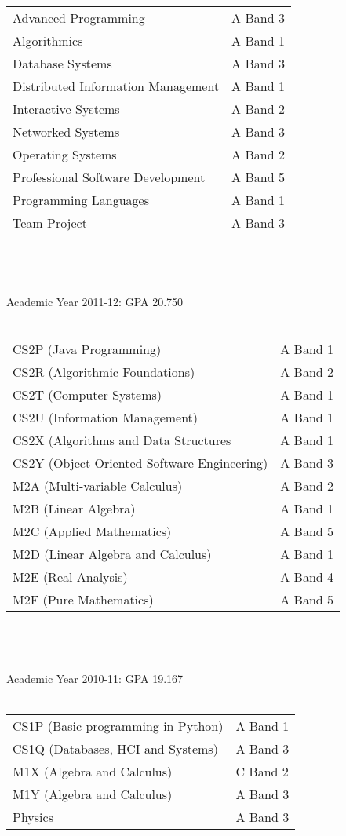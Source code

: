 \documentclass[10pt,a4paper]{article}
\begin{document}
\begin{tabular}{p{10cm}l}
    Advanced Programming & A Band 3\\
    Algorithmics & A Band 1\\
    Database Systems & A Band 3\\
    Distributed Information Management & A Band 1\\
    Interactive Systems & A Band 2\\
    Networked Systems & A Band 3\\
    Operating Systems & A Band 2\\
    Professional Software Development & A Band 5\\
    Programming Languages & A Band 1\\
    Team Project & A Band 3\\
\end{tabular}
\\\\\\
Academic Year 2011-12: GPA 20.750\\\\
\begin{tabular}{p{10cm}l}
    CS2P (Java Programming) & A Band 1\\
    CS2R (Algorithmic Foundations) & A Band 2\\
    CS2T (Computer Systems) & A Band 1\\
    CS2U (Information Management) & A Band 1\\
    CS2X (Algorithms and Data Structures & A Band 1\\
    CS2Y (Object Oriented Software Engineering) & A Band 3\\
    M2A (Multi-variable Calculus) & A Band 2\\
    M2B (Linear Algebra) & A Band 1\\
    M2C (Applied Mathematics) & A Band 5\\
    M2D (Linear Algebra and Calculus) & A Band 1\\
    M2E (Real Analysis) & A Band 4\\
    M2F (Pure Mathematics) & A Band 5\\
\end{tabular}
\\\\\\
Academic Year 2010-11: GPA 19.167\\\\
\begin{tabular}{p{10cm}l}
    CS1P (Basic programming in Python) & A Band 1\\
    CS1Q (Databases, HCI and Systems) & A Band 3\\
    M1X (Algebra and Calculus) & C Band 2\\
    M1Y (Algebra and Calculus) & A Band 3\\
    Physics & A Band 3\\
\end{tabular}
\end{document}
